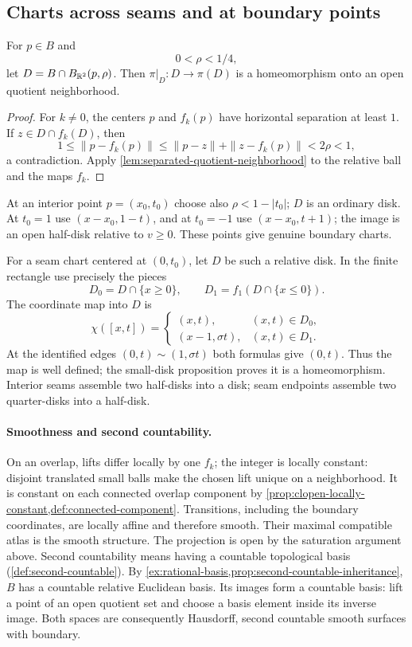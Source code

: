 \subsection{Charts across seams and at boundary points}
\begin{proposition}
For $p\in B$ and
\[
0<\rho<1/4,
\]
 let
$D=B\cap B_{\mathbb{R}^2}(p,\rho)$. Then
$\pi|_D:D\to\pi(D)$ is a homeomorphism onto an open quotient neighborhood.
\end{proposition}
\begin{proof}
For $k\ne0$, the centers $p$ and $f_k(p)$ have horizontal separation
at least $1$. If $z\in D\cap f_k(D)$, then
\[
1\leq\|p-f_k(p)\|\leq\|p-z\|+\|z-f_k(p)\|<2\rho<1,
\]
a contradiction. Apply \cref{lem:separated-quotient-neighborhood} to the
relative ball and the maps $f_k$.
\end{proof}
At an interior point $p=(x_0,t_0)$ choose also $\rho<1-|t_0|$; $D$ is
an ordinary disk. At $t_0=1$ use $(x-x_0,1-t)$, and at $t_0=-1$ use
$(x-x_0,t+1)$; the image is an open half-disk relative to $v\geq0$.
These points give genuine boundary charts.

For a seam chart centered at $(0,t_0)$, let $D$ be such a relative disk.
In the finite rectangle use precisely the pieces
\[
D_0=D\cap\{x\geq0\},\qquad D_1=f_1(D\cap\{x\leq0\}).
\]
The coordinate map into $D$ is
\[
\chi([x,t])=
\begin{cases}(x,t),&(x,t)\in D_0,\\
(x-1,\sigma t),&(x,t)\in D_1.
\end{cases}
\]
At the identified edges $(0,t)\sim(1,\sigma t)$ both formulas give
$(0,t)$. Thus the map is well defined; the small-disk proposition proves
it is a homeomorphism. Interior seams assemble two half-disks into a disk;
seam endpoints assemble two quarter-disks into a half-disk.

\FloatBarrier

\paragraph{Smoothness and second countability.}
On an overlap, lifts differ locally by one $f_k$; the integer is locally
constant: disjoint translated small balls make the chosen lift unique
on a neighborhood. It is constant on each connected overlap component
by \cref{prop:clopen-locally-constant,def:connected-component}. Transitions, including the boundary coordinates, are locally
affine and therefore smooth. Their maximal compatible atlas is the smooth
structure. The projection is open by the saturation argument above.
Second countability means having a countable topological basis
(\cref{def:second-countable}). By
\cref{ex:rational-basis,prop:second-countable-inheritance}, $B$ has a
countable relative Euclidean basis. Its images form a countable
basis: lift a point of an open quotient set and choose a basis element
inside its inverse image. Both spaces are consequently Hausdorff,
second countable smooth surfaces with boundary.

